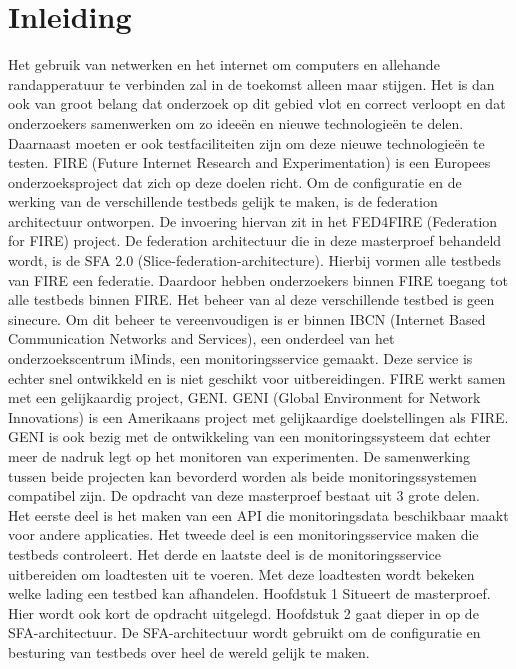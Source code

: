 \chapter{Inleiding}
\npar
Het gebruik van netwerken en het internet om computers en allehande randapperatuur te verbinden zal in de toekomst alleen maar stijgen. Het is dan ook van groot belang dat onderzoek op dit gebied vlot en correct verloopt en dat onderzoekers samenwerken om zo idee\"en en nieuwe technologie\"en te delen. Daarnaast moeten er ook testfaciliteiten zijn om deze nieuwe technologie\"en te testen.
FIRE (Future Internet Research and Experimentation) is een Europees onderzoeksproject dat zich op deze doelen richt.
\npar
Om de configuratie en de werking van de verschillende testbeds gelijk te maken, is de federation architectuur ontworpen. De invoering hiervan zit in het FED4FIRE (Federation for FIRE) project. De federation architectuur die in deze masterproef behandeld wordt, is de SFA 2.0 (Slice-federation-architecture). Hierbij vormen alle testbeds van FIRE een federatie. Daardoor hebben onderzoekers binnen FIRE toegang tot alle testbeds binnen FIRE.
\npar
Het beheer van al deze verschillende testbed is geen sinecure. Om dit beheer te vereenvoudigen is er binnen IBCN (Internet Based Communication Networks and Services), een onderdeel van het onderzoekscentrum iMinds, een monitoringsservice gemaakt. 
Deze service is echter snel ontwikkeld en is niet geschikt voor uitbereidingen. 
\npar
FIRE werkt samen met een gelijkaardig project, GENI. GENI (Global Environment for Network Innovations) is een Amerikaans project met gelijkaardige doelstellingen als FIRE. GENI is ook bezig met de ontwikkeling van een monitoringssysteem dat echter meer de nadruk legt op het monitoren van experimenten. De samenwerking tussen beide projecten kan bevorderd worden als beide monitoringssystemen compatibel zijn.
\npar
De opdracht van deze masterproef bestaat uit 3 grote delen. \\
Het eerste deel is het maken van een API die monitoringsdata beschikbaar maakt voor andere applicaties. Het tweede deel is een monitoringsservice maken die testbeds controleert. Het derde en laatste deel is de monitoringsservice uitbereiden om loadtesten uit te voeren. Met deze loadtesten wordt bekeken welke lading een testbed kan afhandelen.
\clearpage
\npar
Hoofdstuk 1 Situeert de masterproef. Hier wordt ook kort de opdracht uitgelegd.
\npar
Hoofdstuk 2 gaat dieper in op de SFA-architectuur. De SFA-architectuur wordt gebruikt om de configuratie en besturing van testbeds over heel de wereld gelijk te maken.
